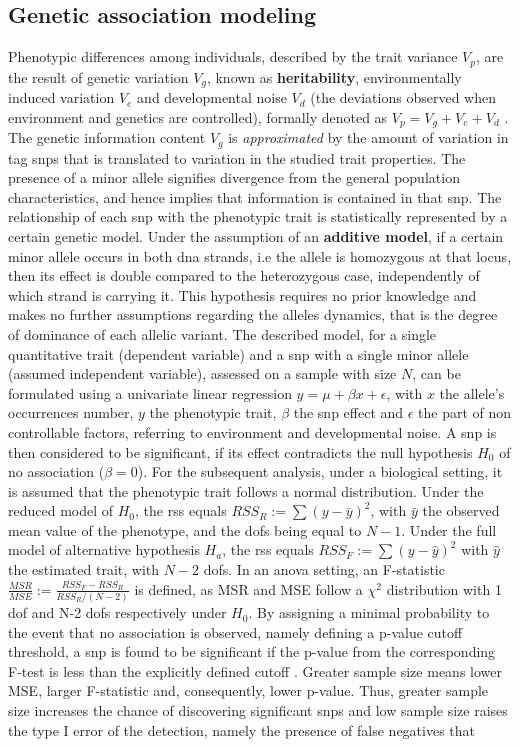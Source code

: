 \subsection{Genetic association modeling}
Phenotypic differences among individuals, described by the trait variance $V_p$,  are the result of genetic variation $V_g$, known as \textbf{heritability}, environmentally induced variation $V_e$ and developmental noise $V_d$ (the deviations observed when environment and genetics are controlled), formally denoted as $V_p=V_g+V_e+V_d$ \cite{Vogt2020}. The genetic information content $V_g$ is \textit{approximated} by the amount of variation in tag \acp{snp} that is translated to variation in the studied trait properties.  The presence of a minor allele signifies divergence from the general population characteristics, and hence implies that information is contained in that \ac{snp}.  The relationship of each \ac{snp} with the phenotypic trait is statistically represented by a certain genetic model. Under the assumption of an \textbf{additive model}, if a certain minor allele occurs in both \ac{dna} strands, i.e the allele is homozygous at that locus, then its effect is double compared to the heterozygous case, independently of which strand is carrying it. This hypothesis requires no prior knowledge and makes no further assumptions regarding the alleles dynamics, that is the degree of dominance of each allelic variant. The described model, for a single quantitative trait (dependent variable) and a \ac{snp} with a single minor allele (assumed independent variable), assessed on a sample with size $N$, can be formulated using a univariate linear regression $y = \mu + \beta x + \epsilon$, with $x$ the allele's occurrences number, $y$ the phenotypic trait, $\beta$ the \ac{snp} effect and $\epsilon$ the part of non controllable factors, referring to environment and developmental noise. A \ac{snp} is then considered to be significant, if its effect contradicts the null hypothesis $H_0$ of no association ($\beta=0$). For the subsequent analysis, under a biological setting, it is assumed that the phenotypic trait follows a normal distribution. Under the reduced model of $H_0$, the \ac{rss} equals $RSS_R:=\sum{(y-\bar{y})^2}$, with $\bar{y}$ the observed mean value of the phenotype, and the \acp{dof} being equal to $N-1$. Under the full model of alternative hypothesis $H_a$, the \ac{rss} equals $RSS_F:=\sum{(y-\hat{y})^2}$ with $\hat{y}$ the estimated trait, with $N-2$ \acp{dof}. In an \ac{anova} setting, an F-statistic $\frac{MSR}{MSE}:=\frac{RSS_F-RSS_R}{RSS_R/(N-2)}$ is defined, as MSR and MSE follow a $\chi^2$ distribution with 1 \ac{dof} and N-2 \acp{dof} respectively under $H_0$. By assigning a minimal probability to the event that no association is observed, namely defining a p-value cutoff threshold, a \ac{snp} is found to be significant if the p-value from the corresponding F-test is less than the explicitly defined cutoff \cite{AlejandroGonzalez-Chica2015}. Greater sample size means lower MSE, larger F-statistic and, consequently, lower p-value. Thus, greater sample size increases the chance of discovering significant \acp{snp} and low sample size raises the type I error of the detection, namely the presence of false negatives that 